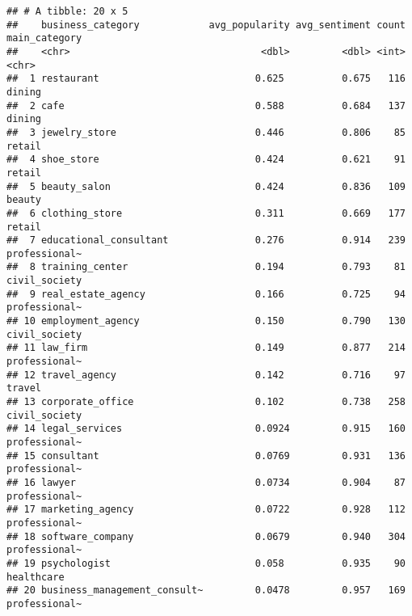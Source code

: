 \documentclass[
]{article}
\begin{document}
\begin{verbatim}
## # A tibble: 20 x 5
##    business_category            avg_popularity avg_sentiment count main_category
##    <chr>                                 <dbl>         <dbl> <int> <chr>        
##  1 restaurant                           0.625          0.675   116 dining       
##  2 cafe                                 0.588          0.684   137 dining       
##  3 jewelry_store                        0.446          0.806    85 retail       
##  4 shoe_store                           0.424          0.621    91 retail       
##  5 beauty_salon                         0.424          0.836   109 beauty       
##  6 clothing_store                       0.311          0.669   177 retail       
##  7 educational_consultant               0.276          0.914   239 professional~
##  8 training_center                      0.194          0.793    81 civil_society
##  9 real_estate_agency                   0.166          0.725    94 professional~
## 10 employment_agency                    0.150          0.790   130 civil_society
## 11 law_firm                             0.149          0.877   214 professional~
## 12 travel_agency                        0.142          0.716    97 travel       
## 13 corporate_office                     0.102          0.738   258 civil_society
## 14 legal_services                       0.0924         0.915   160 professional~
## 15 consultant                           0.0769         0.931   136 professional~
## 16 lawyer                               0.0734         0.904    87 professional~
## 17 marketing_agency                     0.0722         0.928   112 professional~
## 18 software_company                     0.0679         0.940   304 professional~
## 19 psychologist                         0.058          0.935    90 healthcare   
## 20 business_management_consult~         0.0478         0.957   169 professional~
\end{verbatim}
\end{document}
